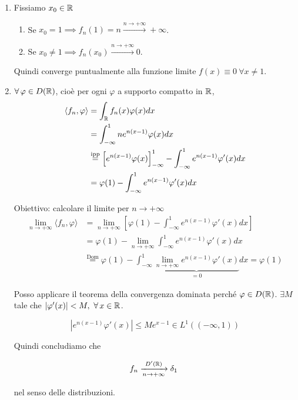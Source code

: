 \begin{enumerate}
\item Fissiamo $x_{0} \in \mathbb{R} $
\begin{enumerate}
\item Se $x_{0} = 1\implies f_{n}(1) = n\xrightarrow{n\rightarrow + \infty } + \infty $.
\item Se $x_{0} \neq 1\implies f_{n}(x_{0})\xrightarrow{n\rightarrow + \infty } 0$.
\end{enumerate}

Quindi converge puntualmente alla funzione limite $f(x) \equiv 0\ \forall x\neq 1$.
\item $\forall \varphi \in D(\RR)$, cioè per ogni $\varphi $ a supporto compatto in $\mathbb{R} $,\begin{align*}
\langle f_{n} ,\varphi \rangle  & = \int _{\mathbb{R} } f_{n}(x) \varphi (x) dx\\
 & = \int ^{1}_{ - \infty } ne^{n(x - 1)} \varphi (x) dx\\
 & \overset{\text{ipp}}{ = }\left[ e^{n(x - 1)} \varphi (x)\right]^{1}_{ - \infty } - \int ^{1}_{ - \infty } e^{n(x - 1)} \varphi '(x) dx\\
 & = \varphi (1) - \int ^{1}_{ - \infty } e^{n(x - 1)} \varphi '(x) dx
\end{align*}

Obiettivo: calcolare il limite per $n\rightarrow + \infty $\begin{align*}
\lim\limits _{n\rightarrow + \infty } \langle f_{n} ,\varphi \rangle  & = \lim\limits _{n\rightarrow + \infty }\left[ \varphi (1) - \int ^{1}_{ - \infty } e^{n(x - 1)} \varphi '(x) dx\right]\\
 & = \varphi (1) - \lim\limits _{n\rightarrow + \infty }\int ^{1}_{ - \infty } e^{n(x - 1)} \varphi '(x) dx\\
 & \overset{\text{Dom}}{ = } \varphi (1) - \int ^{1}_{ - \infty }\underbrace{\lim\limits _{n\rightarrow + \infty } e^{n(x - 1)} \varphi '(x)}_{ = 0} dx = \varphi (1)
\end{align*}

Posso applicare il teorema della convergenza dominata perché $\varphi \in D(\mathbb{R})$. $\exists M$ tale che $| \varphi '(x)| < M,\ \forall x\in \RR $.

\begin{equation*}
\left| e^{n(x - 1)} \varphi '(x)\right| \leq Me^{x - 1} \in L^{1}((- \infty ,1))
\end{equation*}

Quindi concludiamo che

\begin{equation*}
f_{n}\xrightarrow[n\rightarrow + \infty ]{D'(\mathbb{R})} \delta _{1} \ 
\end{equation*}

nel senso delle distribuzioni.
\end{enumerate}
